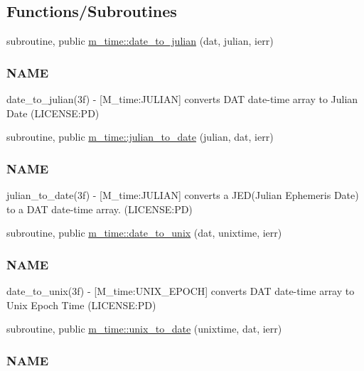 \subsection*{Functions/\+Subroutines}
\begin{DoxyCompactItemize}
\item 
subroutine, public \mbox{\hyperlink{namespacem__time_acfdc970b4154b0c15bd33727636e3992}{m\+\_\+time\+::date\+\_\+to\+\_\+julian}} (dat, julian, ierr)
\begin{DoxyCompactList}\small\item\em \subsubsection*{N\+A\+ME}

date\+\_\+to\+\_\+julian(3f) -\/ \mbox{[}M\+\_\+time\+:J\+U\+L\+I\+AN\mbox{]} converts D\+AT date-\/time array to Julian Date (L\+I\+C\+E\+N\+SE\+:PD) \end{DoxyCompactList}\item 
subroutine, public \mbox{\hyperlink{namespacem__time_abb44cf18cd0a3e420c20469efb056203}{m\+\_\+time\+::julian\+\_\+to\+\_\+date}} (julian, dat, ierr)
\begin{DoxyCompactList}\small\item\em \subsubsection*{N\+A\+ME}

julian\+\_\+to\+\_\+date(3f) -\/ \mbox{[}M\+\_\+time\+:J\+U\+L\+I\+AN\mbox{]} converts a J\+E\+D(\+Julian Ephemeris Date) to a D\+AT date-\/time array. (L\+I\+C\+E\+N\+SE\+:PD) \end{DoxyCompactList}\item 
subroutine, public \mbox{\hyperlink{namespacem__time_aed245c691853279ebf0ce899dec9caa9}{m\+\_\+time\+::date\+\_\+to\+\_\+unix}} (dat, unixtime, ierr)
\begin{DoxyCompactList}\small\item\em \subsubsection*{N\+A\+ME}

date\+\_\+to\+\_\+unix(3f) -\/ \mbox{[}M\+\_\+time\+:U\+N\+I\+X\+\_\+\+E\+P\+O\+CH\mbox{]} converts D\+AT date-\/time array to Unix Epoch Time (L\+I\+C\+E\+N\+SE\+:PD) \end{DoxyCompactList}\item 
subroutine, public \mbox{\hyperlink{namespacem__time_acc62ada23f8fa2fe67b428702fbcbf1c}{m\+\_\+time\+::unix\+\_\+to\+\_\+date}} (unixtime, dat, ierr)
\begin{DoxyCompactList}\small\item\em \subsubsection*{N\+A\+ME}


\end{DoxyCompactList}
\end{DoxyCompactItemize}
